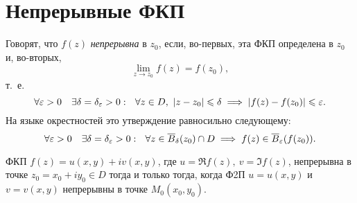 \documentclass[../../main.tex]{subfiles}
\begin{document}
\section{Непрерывные ФКП}

Говорят, что $f(z)$ \emph{непрерывна} в $z_0$,
если, во-первых, эта ФКП определена в $z_0$ и,
во-вторых,
\begin{equation}
\label{lec28:2}
\lim\limits_{z \to z_0} f(z)= f(z_0),
\end{equation}
т.~е.
\[
\forall \varepsilon > 0 \quad \exists \delta = \delta_{\varepsilon} > 0 : \ \
\forall z \in D ,\ \left|{z - z_0}\right| \leqslant \delta
\implies \left|{f(z) - f(z_0)}\right| \leqslant \varepsilon.
\]
На языке окрестностей это утверждение равносильно следующему:
\[
\forall \varepsilon > 0 \quad \exists \delta = \delta_{\varepsilon} > 0 : \ \
\forall z \in \overline{B}_{\delta} (z_0) \cap D
\implies f(z) \in \overline{B}_{\varepsilon} (f(z_0)).
\]
\begin{thm}
	ФКП $f(z) = u(x, y) + i v(x, y)$, где $u = \Re f(z),\ v = \Im f(z)$,
	непрерывна в точке $z_0 = x_0 + i y_0 \in D$
	тогда и только тогда, когда
	Ф2П $u = u(x, y)$ и $v = v(x, y)$ непрерывны в точке $M_0(x_0, y_0)$.
\end{thm}
\end{document}
